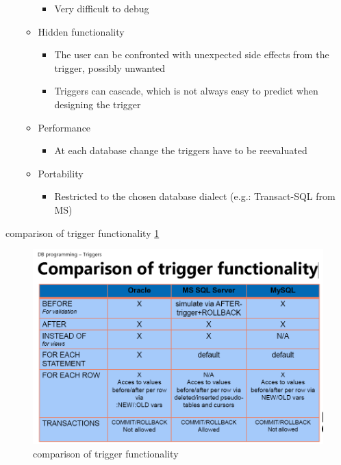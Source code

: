 \documentclass{report}
\begin{document}
\begin{itemize}
\begin{itemize}
\begin{itemize}
                \item Very difficult to debug
            \end{itemize}
            \item Hidden functionality
            \begin{itemize}
                \item The user can be confronted with unexpected side effects from the trigger, possibly unwanted
                \item Triggers can cascade, which is not always easy to predict when designing the trigger
            \end{itemize}
            \item Performance
            \begin{itemize}
                \item At each database change the triggers have to be reevaluated
            \end{itemize}
            \item Portability
            \begin{itemize}
                \item Restricted to the chosen database dialect (e.g.: Transact-SQL from MS)
            \end{itemize}
        \end{itemize}
    \end{itemize}

    comparison of trigger functionality \ref{fig:comparisonTriggerFunc}\\
    \begin{figure}
        \includegraphics[width=350pt]{./images/comparison of trigger functionality.png}
        \caption{\label{fig:comparisonTriggerFunc}comparison of trigger functionality}
    \end{figure}
\end{document}
